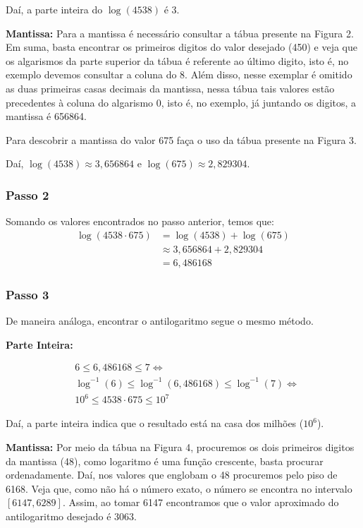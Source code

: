Daí, a parte inteira do $\log(4538)$ é 3.

\textbf{Mantissa:}
Para a mantissa é necessário consultar a tábua presente na Figura 2. Em suma, basta encontrar os primeiros digitos do valor desejado (450) e veja que os algarismos da parte superior da tábua é referente ao último digito, isto é, no exemplo devemos consultar a coluna do 8. Além disso, nesse exemplar é omitido as duas primeiras casas decimais da mantissa, nessa tábua tais valores estão precedentes à coluna do algarismo 0, isto é, no exemplo, já juntando os digitos, a mantissa é 656864.

Para descobrir a mantissa do valor 675 faça o uso da tábua presente na Figura 3.

Daí, $\log(4538) \approx 3,656864$ e $\log(675) \approx 2,829304$.

\subsubsection{Passo 2}

Somando os valores encontrados no passo anterior, temos que:
\begin{align*}
    \log(4538 \cdot 675) &= \log(4538) + \log(675) \\
                        &\approx 3{,}656864 + 2{,}829304 \\
                        &= 6{,}486168
\end{align*}

\subsubsection{Passo 3}
De maneira análoga, encontrar o antilogaritmo segue o mesmo método.

\textbf{Parte Inteira:}

\begin{align*}
    & 6 \le 6{,}486168 \le 7 \iff \\
    & \log^{-1}(6) \le \log^{-1}(6{,}486168) \le \log^{-1}(7) \iff \\
    & 10^6 \le 4538 \cdot 675 \le 10^7
\end{align*}

Daí, a parte inteira indica que o resultado está na casa dos milhões ($10^6$).

\textbf{Mantissa:}
Por meio da tábua na Figura 4, procuremos os dois primeiros digitos da mantissa (48), como logaritmo é uma função crescente, basta procurar ordenadamente. Daí, nos valores que englobam o 48 procuremos pelo piso de 6168. Veja que, como não há o número exato, o número se encontra no intervalo $[6147, 6289]$. Assim, ao tomar 6147 encontramos que o valor aproximado do antilogaritmo desejado é 3063.

